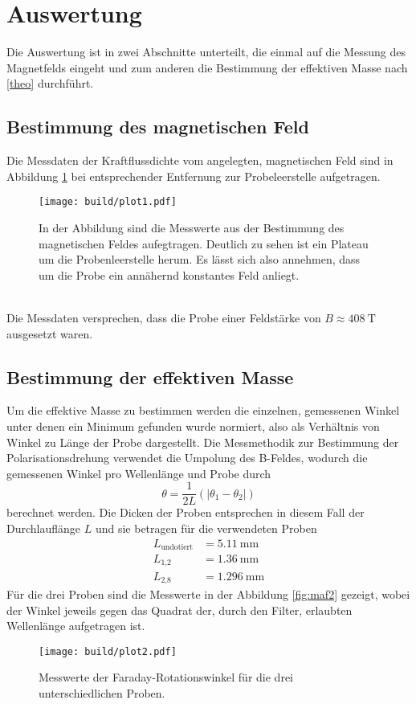\newpage
\section{Auswertung}
Die Auswertung ist in zwei Abschnitte unterteilt, die einmal auf die Messung des Magnetfelds eingeht und zum 
anderen die Bestimmung der effektiven Masse nach \ref{theo} durchführt. 
\subsection{Bestimmung des magnetischen Feld}
Die Messdaten der Kraftflussdichte vom angelegten, magnetischen Feld sind in Abbildung \ref{fig:mag}
bei entsprechender Entfernung zur Probeleerstelle aufgetragen.
\begin{figure}
    \centering
    \texttt{[image: build/plot1.pdf]}
    \caption{In der Abbildung sind die Messwerte aus der Bestimmung des magnetischen Feldes aufegtragen. 
            Deutlich zu sehen ist ein Plateau um die Probenleerstelle herum. Es lässt sich also annehmen, dass
            um die Probe ein annähernd konstantes Feld anliegt.}
    \label{fig:mag}
\end{figure}
\\
Die Messdaten versprechen, dass die Probe einer Feldstärke von 
    $B \approx \SI{408}{\tesla}$
ausgesetzt waren.

\subsection{Bestimmung der effektiven Masse}
Um die effektive Masse zu bestimmen werden die einzelnen, gemessenen Winkel unter denen ein Minimum gefunden wurde
normiert, also als Verhältnis von Winkel zu Länge der Probe dargestellt. 
Die Messmethodik zur Bestimmung der Polarisationsdrehung verwendet die Umpolung des B-Feldes, wodurch die gemessenen Winkel pro Wellenlänge und Probe durch 
\begin{equation}
\theta = \frac{1}{2L} (|\theta_1 - \theta_2|)
\end{equation}
berechnet werden. Die Dicken der Proben entsprechen in diesem Fall der Durchlauflänge $L$ und sie betragen für die verwendeten Proben
\begin{align*}
L_{\text{undotiert}} &= \SI{5.11}{\milli\meter}\\
L_{1\text{,}2} &= \SI{1.36}{\milli\meter} \\
L_{2\text{,}8} &= \SI{1.296}{\milli\meter}
\end{align*}
Für die drei Proben sind die Messwerte in der Abbildung \ref{fig:maf2} gezeigt, wobei der Winkel 
jeweils gegen das Quadrat der, durch den Filter, erlaubten Wellenlänge aufgetragen ist.
\begin{figure}
    \centering
    \texttt{[image: build/plot2.pdf]}
    \caption{Messwerte der Faraday-Rotationswinkel für die drei unterschiedlichen Proben. }
    \label{maf2}
\end{figure}

